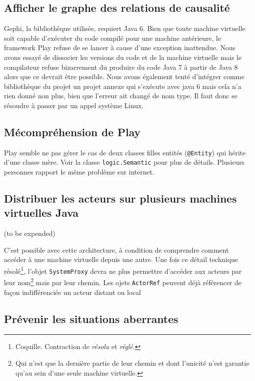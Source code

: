 \documentclass[11pt]{article}
\begin{document}
\subsection{Afficher le graphe des relations de causalité} Gephi, la bibliothèque utilisée, requiert Java 6. Bien que toute machine virtuelle soit capable d'exécuter du code compilé pour une machine antérieure, le framework Play refuse de se lancer à cause d'une exception inattendue.
Nous avons essayé de dissocier les versions du code et de la machine virtuelle mais le compilateur refuse bizarrement du produire du code Java 7 à partir de Java 8 alors que ce devrait être possible. Nous avons également tenté d'intégrer comme bibliothèque du projet un projet annexe qui s'exécute avec java 6 mais cela n'a rien donné non plus, bien que l'erreur ait changé de nom type. Il faut donc se résoudre à passer par un appel système Linux.

\subsection{Mécompréhension de Play} Play semble ne pas gérer le cas de deux classes filles entités (\texttt{@Entity}) qui hérite d'une classe mère. Voir la classe \texttt{logic.Semantic} pour plus de détails. Plusieurs personnes rapport le même problème sur internet.

\subsection{Distribuer les acteurs sur plusieurs machines virtuelles Java}

(to be expended)

C'est possible avec cette architecture, à condition de comprendre comment accéder à une machine virtuelle depuis une autre. Une fois ce détail technique résolé\footnote{Coquille. Contraction de \textsl{résolu} et \textsl{réglé}.}, l'objet \texttt{SystemProxy} devra ne plus permettre d'accéder aux acteurs par leur nom\footnote{Qui n'est que la dernière partie de leur chemin et dont l'unicité n'est garantie qu'au sein d'une seule machine virtuelle.} mais par leur chemin. Les ojets \texttt{ActorRef} peuvent déjà référencer de façon indifférenciée un acteur distant ou local

\subsection{Prévenir les situations aberrantes}
\end{document}
